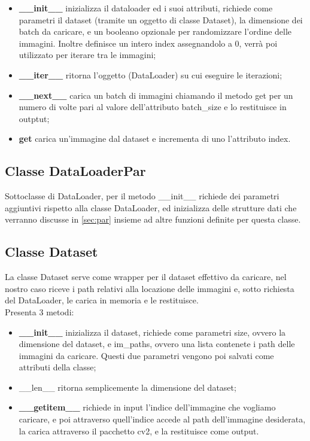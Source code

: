 \documentclass[10pt,twocolumn,letterpaper]{article}
\newcommand{\bit} {\begin{itemize} }
\newcommand{\eit} {\end{itemize} }
\begin{document}
\bit
    \item{\textbf{\_\_init\_\_} inizializza il dataloader ed i suoi attributi, richiede come parametri il dataset (tramite un oggetto di classe Dataset), la dimensione dei batch da caricare, e un booleano opzionale per randomizzare l'ordine delle immagini. Inoltre definisce un intero index assegnandolo a 0, verrà poi utilizzato per iterare tra le immagini;}
    \item{\textbf{\_\_iter\_\_} ritorna l'oggetto (DataLoader) su cui eseguire le iterazioni;}
    \item{\textbf{\_\_next\_\_} carica un batch di immagini chiamando il metodo get per un numero di volte pari al valore dell'attributo batch\_size e lo restituisce in outptut;}
    \item{\textbf{get} carica un'immagine dal dataset e incrementa di uno l'attributo index.}
\eit

\subsection{Classe DataLoaderPar}
Sottoclasse di DataLoader, per il metodo \_\_init\_\_ richiede dei parametri aggiuntivi rispetto alla classe DataLoader, ed inizializza delle strutture dati che verranno discusse in \cref{sec:par} insieme ad altre funzioni definite per questa classe.

\subsection{Classe Dataset}
La classe Dataset serve come wrapper per il dataset effettivo da caricare, nel nostro caso riceve i path relativi alla locazione delle immagini e, sotto richiesta del DataLoader, le carica in memoria e le restituisce.\\
Presenta 3 metodi:

\bit
    \item{\textbf{\_\_init\_\_} inizializza il dataset, richiede come parametri size, ovvero la dimensione del dataset, e im\_paths, ovvero una lista contenete i path delle immagini da caricare. Questi due parametri vengono poi salvati come attributi della classe;}
    \item{\_\_len\_\_ ritorna semplicemente la dimensione del dataset;}
    \item{\textbf{\_\_getitem\_\_} richiede in input l'indice dell'immagine che vogliamo caricare, e poi attraverso quell'indice accede al path dell'immagine desiderata, la carica attraverso il pacchetto cv2, e la restituisce come output.}
\eit
\end{document}
